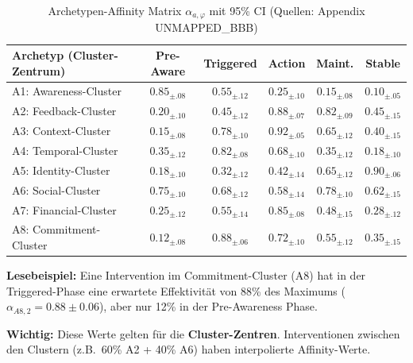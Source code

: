 \begin{table}[htbp]
\centering
\caption{Archetypen-Affinity Matrix $\alpha_{a,\varphi}$ mit 95\% CI (Quellen: Appendix UNMAPPED_BBB)}
\label{tab:18-affinity-matrix-full}
\renewcommand{\arraystretch}{1.3}
\footnotesize
\begin{tabular}{@{}lccccc@{}}
\toprule
\textbf{Archetyp (Cluster-Zentrum)} & \textbf{Pre-Aware} & \textbf{Triggered} & \textbf{Action} & \textbf{Maint.} & \textbf{Stable} \\
\midrule
A1: Awareness-Cluster & \cellcolor{green!25}$0.85_{\pm.08}$ & $0.55_{\pm.12}$ & $0.25_{\pm.10}$ & $0.15_{\pm.08}$ & $0.10_{\pm.05}$ \\
A2: Feedback-Cluster & $0.20_{\pm.10}$ & $0.45_{\pm.12}$ & \cellcolor{green!25}$0.88_{\pm.07}$ & \cellcolor{green!25}$0.82_{\pm.09}$ & $0.45_{\pm.15}$ \\
A3: Context-Cluster & $0.15_{\pm.08}$ & \cellcolor{green!25}$0.78_{\pm.10}$ & \cellcolor{green!25}$0.92_{\pm.05}$ & $0.65_{\pm.12}$ & $0.40_{\pm.15}$ \\
A4: Temporal-Cluster & $0.35_{\pm.12}$ & \cellcolor{green!25}$0.82_{\pm.08}$ & $0.68_{\pm.10}$ & $0.35_{\pm.12}$ & $0.18_{\pm.10}$ \\
A5: Identity-Cluster & $0.18_{\pm.10}$ & $0.32_{\pm.12}$ & $0.42_{\pm.14}$ & $0.65_{\pm.12}$ & \cellcolor{green!25}$0.90_{\pm.06}$ \\
A6: Social-Cluster & \cellcolor{green!25}$0.75_{\pm.10}$ & $0.68_{\pm.12}$ & $0.58_{\pm.14}$ & \cellcolor{green!25}$0.78_{\pm.10}$ & $0.62_{\pm.15}$ \\
A7: Financial-Cluster & $0.25_{\pm.12}$ & $0.55_{\pm.14}$ & \cellcolor{green!25}$0.85_{\pm.08}$ & $0.48_{\pm.15}$ & $0.28_{\pm.12}$ \\
A8: Commitment-Cluster & $0.12_{\pm.08}$ & \cellcolor{green!25}$0.88_{\pm.06}$ & $0.72_{\pm.10}$ & $0.55_{\pm.12}$ & $0.35_{\pm.15}$ \\
\bottomrule
\end{tabular}
\end{table}

\textbf{Lesebeispiel:} Eine Intervention im Commitment-Cluster (A8) hat in der Triggered-Phase eine erwartete Effektivit\"{a}t von 88\% des Maximums ($\alpha_{A8,2} = 0.88 \pm 0.06$), aber nur 12\% in der Pre-Awareness Phase.

\textbf{Wichtig:} Diese Werte gelten f\"{u}r die \textbf{Cluster-Zentren}. Interventionen zwischen den Clustern (z.B.\ 60\% A2 + 40\% A6) haben interpolierte Affinity-Werte.

